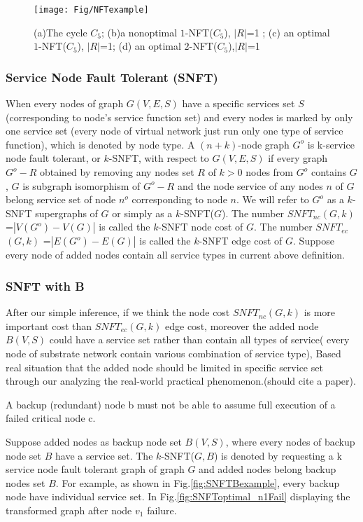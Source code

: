 \begin{figure}
  \centering
  \texttt{[image: Fig/NFTexample]}\\
  \caption{(a)The cycle $C_5$; (b)a nonoptimal $1$-NFT($C_5$), $|R|$=1 ; (c) an optimal $1$-NFT($C_5$), $|R|$=1; (d) an optimal $2$-NFT($C_5$),$|R|$=1 }\label{fig:NFTexample}
\end{figure}

\subsubsection{Service Node Fault Tolerant (SNFT)}
When every nodes of graph $G(V,E,S)$ have a specific services set $S$ (corresponding to node's service function set) and every nodes is marked by only one service set (every node of virtual network just run only one type of service function), which is denoted by node type. A $(n+k)$-node graph $G^o$ is k-service node fault tolerant, or $k$-SNFT, with respect to $G(V,E,S)$ if every graph $G^o-R$ obtained by removing any nodes set $R$ of $k>0$ nodes from $G^o$ contains $G$, $G$ is subgraph isomorphism of $G^o-R$ and the node service of any nodes $n$ of $G$ belong service set of node $n^o$ corresponding to node $n$. We will refer to $G^o$ as a $k$-SNFT supergraphs of $G$ or simply as a $k$-SNFT($G$). The number $SNFT_{nc}$$(G,k)$ =$|V(G^o)-V(G)|$ is called the $k$-SNFT node cost of $G$. The number $SNFT_{ec}$$(G,k)$ =$|E(G^o)-E(G)|$ is called the $k$-SNFT edge cost of $G$. Suppose every node of added nodes contain all service types in current above definition.
\subsubsection{SNFT with B}
After our simple inference, if we think the node cost $SNFT_{nc}(G,k)$  is more important cost than $SNFT_{ec}(G,k)$  edge cost, moreover the added node $B(V,S)$ could have a service set rather than contain all types of service( every node of substrate network contain various combination of service type), Based real situation that the added node should be limited in specific service set through our analyzing the real-world practical phenomenon.(should cite a paper).

A backup (redundant) node b must not be able to assume full execution of a failed critical node c.

Suppose added nodes as backup node set $B(V,S)$, where every nodes of backup node set $B$ have a service set. The $k$-SNFT($G,B$) is denoted by requesting a k service node fault tolerant graph of graph $G$ and added nodes belong backup nodes set $B$. For example, as shown in Fig.\ref{fig:SNFTBexample}, every backup node have individual service set. In Fig.\ref{fig:SNFToptimal_n1Fail} displaying the transformed graph after node $v_1$ failure.

